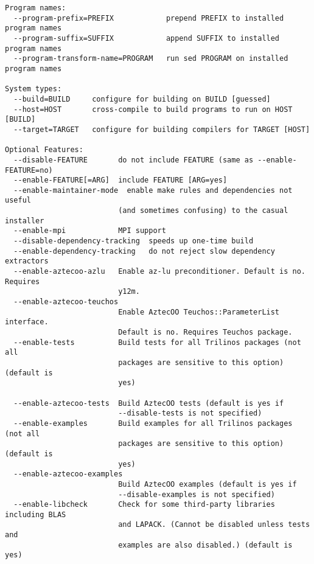 \begin{Verbatim}
Program names:
  --program-prefix=PREFIX            prepend PREFIX to installed program names
  --program-suffix=SUFFIX            append SUFFIX to installed program names
  --program-transform-name=PROGRAM   run sed PROGRAM on installed program names

System types:
  --build=BUILD     configure for building on BUILD [guessed]
  --host=HOST       cross-compile to build programs to run on HOST [BUILD]
  --target=TARGET   configure for building compilers for TARGET [HOST]

Optional Features:
  --disable-FEATURE       do not include FEATURE (same as --enable-FEATURE=no)
  --enable-FEATURE[=ARG]  include FEATURE [ARG=yes]
  --enable-maintainer-mode  enable make rules and dependencies not useful
                          (and sometimes confusing) to the casual installer
  --enable-mpi            MPI support
  --disable-dependency-tracking  speeds up one-time build
  --enable-dependency-tracking   do not reject slow dependency extractors
  --enable-aztecoo-azlu   Enable az-lu preconditioner. Default is no. Requires
                          y12m.
  --enable-aztecoo-teuchos
                          Enable AztecOO Teuchos::ParameterList interface.
                          Default is no. Requires Teuchos package.
  --enable-tests          Build tests for all Trilinos packages (not all
                          packages are sensitive to this option) (default is
                          yes)

  --enable-aztecoo-tests  Build AztecOO tests (default is yes if
                          --disable-tests is not specified)
  --enable-examples       Build examples for all Trilinos packages (not all
                          packages are sensitive to this option) (default is
                          yes)
  --enable-aztecoo-examples
                          Build AztecOO examples (default is yes if
                          --disable-examples is not specified)
  --enable-libcheck       Check for some third-party libraries including BLAS
                          and LAPACK. (Cannot be disabled unless tests and
                          examples are also disabled.) (default is yes)


\end{Verbatim}
